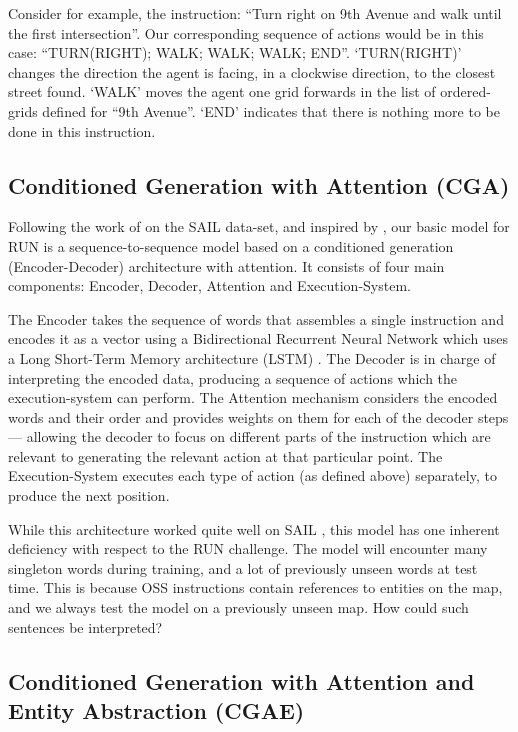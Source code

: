\documentclass[11pt,a4paper]{article}
\begin{document}
Consider for example, the instruction: \enquote {Turn right on 9th Avenue and walk until the first intersection}.
Our corresponding sequence of actions would be in this case:
\enquote{TURN(RIGHT); WALK; WALK; WALK; END}. \enquote*{TURN(RIGHT)} changes the direction the agent is facing, 
in a clockwise direction, to the closest street found. \enquote*{WALK} moves the agent one grid forwards in the list of ordered-grids defined for \enquote{9th Avenue}. \enquote*{END} indicates that there is nothing more to be done in this instruction.  


\subsection{Conditioned Generation with Attention (CGA)}
Following the work of \citet{mei2015listen} on the SAIL data-set, and inspired by \citet{xu2015show}, our basic model for RUN is a sequence-to-sequence model based on a conditioned generation (Encoder-Decoder) architecture with attention. It consists of four main components: Encoder, Decoder, Attention and Execution-System.

The Encoder   takes the sequence of words that assembles a single instruction and encodes it as a vector using a Bidirectional Recurrent Neural Network which uses a Long Short-Term Memory architecture (LSTM) \citep {graves2005framewise}.  
The Decoder is in charge of interpreting the encoded data,   producing a sequence of actions which the execution-system can perform. 
%
The Attention mechanism considers the encoded words and their order and  provides weights on them for  each of the decoder steps ---  allowing the decoder to focus on different parts of the instruction which are relevant to generating the  relevant action at that particular point.
%
The Execution-System executes each type of   action (as defined above)  separately, to produce the next position. 

While this architecture worked quite well on SAIL \cite{mei2015listen}, this model has one inherent deficiency with respect to the RUN challenge. The model will  encounter many singleton words during training, and a lot of previously unseen words at test time. This is because  OSS instructions  contain  references to entities on the map, and we always test the model on a previously unseen map. How could such sentences be interpreted?


\subsection{Conditioned Generation with Attention and Entity Abstraction (CGAE)}
\end{document}
